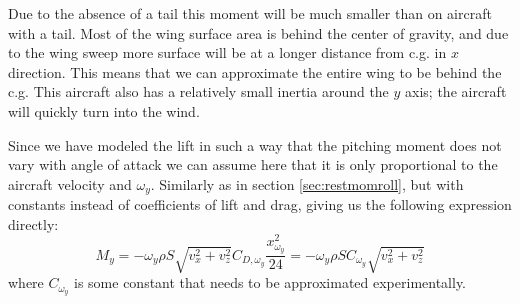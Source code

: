 Due to the absence of a tail this moment will be much smaller than on aircraft with a tail.
Most of the wing surface area is behind the center of gravity, and due to the wing sweep more surface will be at a longer distance from c.g. in $x$ direction.
This means that we can approximate the entire wing to be behind the c.g.
This aircraft also has a relatively small inertia around the $y$ axis; the aircraft will quickly turn into the wind.

Since we have modeled the lift in such a way that the pitching moment does not vary with angle of attack we can assume here that it is only proportional to the aircraft velocity and $\omega_y$.
Similarly as in section \ref{sec:restmomroll}, but with constants instead of coefficients of lift and drag, giving us the following expression directly:
\begin{equation}
    M_y = -\omega_y \rho S \sqrt{v_x^2 + v_z^2} C_{D,\omega_y} \frac{x_{\omega_y}^2}{24}
    =
    -\omega_y \rho S C_{\omega_y} \sqrt{v_x^2 + v_z^2}
\end{equation}
where $C_{\omega_y}$ is some constant that needs to be approximated experimentally.
